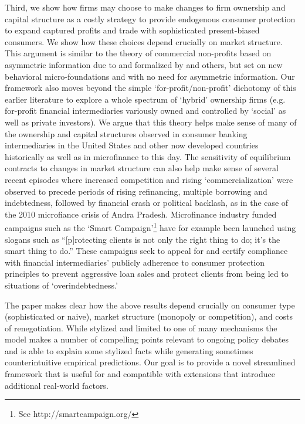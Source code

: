 \documentclass[11pt,english]{article}
\theoremstyle{plain}
\theoremstyle{definition}
\begin{document}
Third, we show how firms may choose to make  changes to firm ownership and capital structure as a costly strategy to provide endogenous consumer protection to expand captured profits and trade with sophisticated present-biased consumers. We show how these
choices depend crucially on market structure. This argument is similar to the theory of commercial non-profits based on asymmetric information due to \citet[][]{hansmann1996} and formalized by \cite{glaeser2001} and others, but set on new behavioral micro-foundations and with no need for asymmetric information.  Our framework also moves beyond the simple `for-profit/non-profit' dichotomy of this earlier literature to explore a whole spectrum of `hybrid' ownership firms (e.g. for-profit financial intermediaries variously owned and controlled by  `social'   as well as private investors).
We argue that this theory helps make sense of many of the ownership and capital structures observed in  consumer banking intermediaries  in the United States and other now developed countries historically as well as in microfinance to this day.  The sensitivity of equilibrium contracts to changes in market structure can also help make sense of several recent episodes where increased competition and rising `commercialization'
were observed to precede periods of rising refinancing, multiple borrowing and indebtedness, followed by financial crash or political backlash, as in the case of the 2010 microfiance crisis of Andra Pradesh.   
 Microfinance industry funded campaigns such as the `Smart Campaign'\footnote{See http://smartcampaign.org/} have for example been launched using slogans such as  ``[p]rotecting clients is not only the right thing to do; it's the smart thing to do.''  These campaigns seek to appeal for and certify compliance with financial intermediaries' publicly adherence to consumer protection principles to  prevent aggressive loan sales and protect clients from being led to situations of `overindebtedness.' 


The paper makes clear how the above results depend crucially on consumer
type (sophisticated or naive), market structure (monopoly or competition),
and costs of renegotiation. While stylized and limited
to one of many mechanisms the model makes a number of
compelling points relevant to ongoing policy debates and is able to
explain some stylized facts while generating sometimes counterintuitive
empirical predictions. Our goal is to provide a novel streamlined
framework that is useful for and compatible with extensions that introduce
additional real-world factors.
\end{document}
